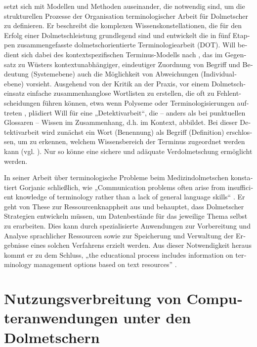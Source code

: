 \documentclass[output=paper]{LSP/langsci}
\begin{document}
\begin{otherlanguage}{ngerman}
\largerpage
\citet{Will2009} setzt sich mit Modellen und Methoden auseinander, die notwendig sind, um die strukturellen Prozesse der Organisation terminologischer Arbeit für Dolmetscher zu definieren. Er beschreibt die komplexen Wissenskonstellationen, die für den Erfolg einer Dolmetschleistung grundlegend sind und entwickelt die in fünf Etappen zusammengefasste dolmetschorientierte Terminologiearbeit (DOT). Will bedient sich dabei des kontextspezifischen Terminus-Modells nach \citet{gerzymisch1996termini}, das im Gegensatz zu Wüsters kontextunabhängiger, eindeutiger Zuordnung von Begriff und Bedeutung (Systemebene) auch die Möglichkeit von Abweichungen (Individualebene) vorsieht. Ausgehend von der Kritik an der Praxis, vor einem Dolmetscheinsatz einfache zusammenhanglose Wortlisten zu erstellen, die oft zu Fehlentscheidungen führen können, etwa wenn Polyseme oder Terminologisierungen auftreten \citep[6]{Will2009}, plädiert Will für eine „Detektivarbeit“, die -- anders als bei punktuellen Glossaren -- Wissen im Zusammenhang, d.h. im Kontext, abbildet. Bei dieser Detektivarbeit wird zunächst ein Wort (Benennung) als Begriff (Definition) erschlossen, um zu erkennen, welchem Wissensbereich der Terminus zugeordnet werden kann (vgl. \citealt{Will2010}). Nur so könne eine sichere und adäquate Verdolmetschung ermöglicht werden.

In seiner Arbeit über terminologische Probleme beim Medizindolmetschen konstatiert Gorjanic schließlich, wie „Communication problems often arise from insufficient knowledge of terminology rather than a lack of general language skills“ \citep[85]{Gorjanc2009}. Er geht von \citet{Fantinuoli2006} These zur Ressourcenknappheit aus und behauptet, dass Dolmetscher Strategien entwickeln müssen, um Datenbestände für das jeweilige Thema selbst zu erarbeiten. Dies kann durch spezialisierte Anwendungen zur Vorbereitung und Analyse sprachlicher Ressourcen sowie zur Speicherung und Verwaltung der Ergebnisse eines solchen Verfahrens erzielt werden. Aus dieser Notwendigkeit heraus kommt er zu dem Schluss, „the educational process includes information on terminology management options based on text resources” \citep[89]{Gorjanc2009}.

\section{Nutzungsverbreitung von Computeranwendungen unter den Dolmetschern}\label{sec:fantinuoli:3}


\end{otherlanguage}
\end{document}
